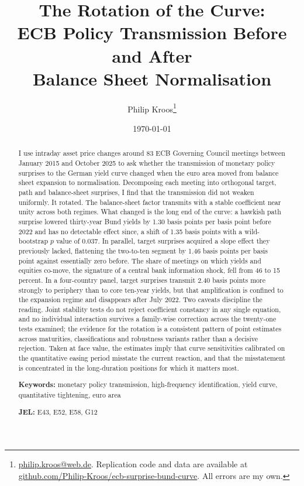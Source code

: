 \documentclass[11pt]{article}
\title{\textbf{The Rotation of the Curve:\\ ECB Policy Transmission Before and After\\ Balance Sheet Normalisation}}
\author{Philip Kroos\thanks{\raggedright \href{mailto:philip.kroos@web.de}{philip.kroos@web.de}. Replication code and data
are available at \url{github.com/Philip-Kroos/ecb-surprise-bund-curve}. All errors
are my own.}}
\date{\today}
\begin{document}
\maketitle

\begin{abstract}
\noindent I use intraday asset price changes around 83 ECB Governing Council
meetings between January 2015 and October 2025 to ask whether the transmission
of monetary policy surprises to the German yield curve changed when the euro
area moved from balance sheet expansion to normalisation. Decomposing each
meeting into orthogonal target, path and balance-sheet surprises, I find that
the transmission did not weaken uniformly. It rotated. The balance-sheet factor
transmits with a stable coefficient near unity across both regimes. What changed
is the long end of the curve: a hawkish path surprise lowered thirty-year Bund
yields by 1.30 basis points per basis point before 2022 and has no detectable
effect since, a shift of 1.35 basis points with a wild-bootstrap $p$ value of
0.037. In parallel, target surprises acquired a slope effect they previously
lacked, flattening the two-to-ten segment by 1.46 basis points per basis point
against essentially zero before. The share of meetings on which yields and
equities co-move, the signature of a central bank information shock, fell from
46 to 15 percent. In a four-country panel, target surprises transmit 2.40 basis
points more strongly to periphery than to core ten-year yields, but that
amplification is confined to the expansion regime and disappears after July
2022. Two caveats discipline the reading. Joint stability tests do not reject
coefficient constancy in any single equation, and no individual interaction
survives a family-wise correction across the twenty-one tests examined; the
evidence for the rotation is a consistent pattern of point estimates across
maturities, classifications and robustness variants rather than a decisive
rejection. Taken at face value, the estimates imply that curve sensitivities
calibrated on the quantitative easing period misstate the current reaction, and
that the misstatement is concentrated in the long-duration positions for which
it matters most.

\vspace{1em}
\noindent \textbf{Keywords:} monetary policy transmission, high-frequency
identification, yield curve, quantitative tightening, euro area

\noindent \textbf{JEL:} E43, E52, E58, G12
\end{abstract}
\end{document}
